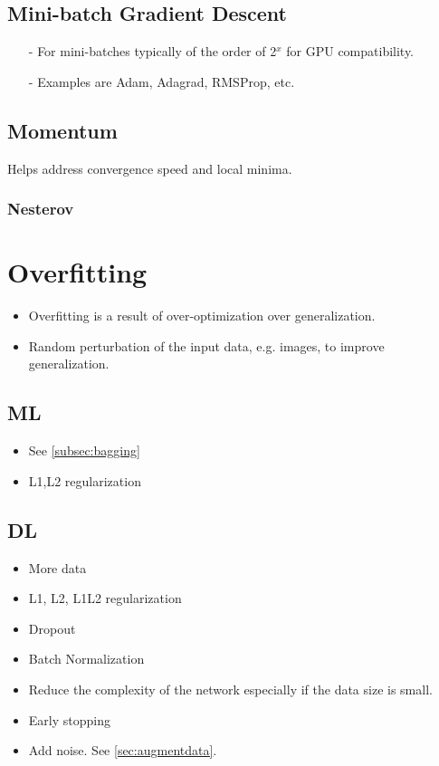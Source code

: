\documentclass[a4paper, 12pt]{report}
\begin{document}
\section{Mini-batch Gradient Descent}
\begin{itemize}
\item[-] For mini-batches typically of the order of 2$^x$ for GPU compatibility.
\item[-] Examples are Adam, Adagrad, RMSProp, etc.
\end{itemize}

\section{Momentum}
Helps address convergence speed and local minima.

\subsection{Nesterov}

\chapter{Overfitting}
\begin{itemize}
\item Overfitting is a result of over-optimization over generalization.
\item Random perturbation of the input data, e.g. images, to improve generalization.
\end{itemize}
\section{ML}
\begin{itemize}
\item See  \autoref{subsec:bagging}
\item L1,L2 regularization
\end{itemize}

\section{DL}
\begin{itemize}
\item More data
\item L1, L2, L1L2 regularization
\item Dropout
\item Batch Normalization
\item Reduce the complexity of the network especially if the data size is small.
\item Early stopping
\item Add noise. See  \autoref{sec:augmentdata}.
\end{itemize}
\end{document}
